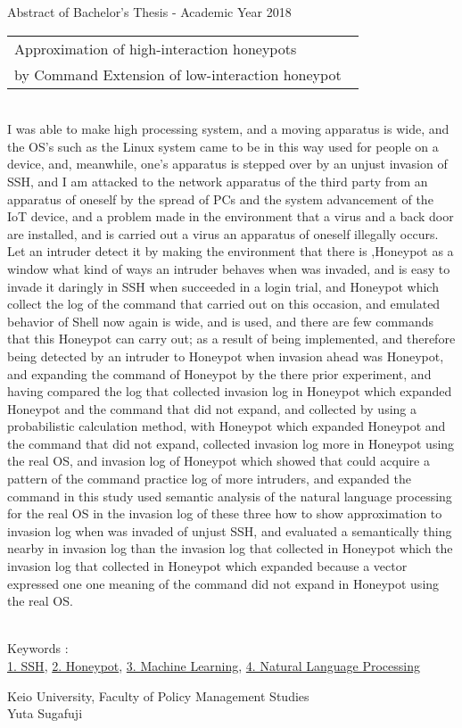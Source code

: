 Abstract of Bachelor's Thesis - Academic Year 2018
\begin{center}
\begin{large}
\begin{tabular}{|p{0.97\linewidth}|}
    \hline
        Approximation of high-interaction honeypots\\
by Command Extension of low-interaction honeypot\\
    \hline
\end{tabular}
\end{large}
\end{center}

~ \\
\renewcommand{\baselinestretch}{0.9}
I was able to make high processing system, and a moving apparatus is wide, and the OS's such as the Linux system came to be in this way used for people on a device, and, meanwhile, one's apparatus is stepped over by an unjust invasion of SSH, and I am attacked to the network apparatus of the third party from an apparatus of oneself by the spread of PCs and the system advancement of the IoT device, and a problem made in the environment that a virus and a back door are installed, and is carried out a virus an apparatus of oneself illegally occurs.
Let an intruder detect it by making the environment that there is ,Honeypot as a window what kind of ways an intruder behaves when was invaded, and is easy to invade it daringly in SSH when succeeded in a login trial, and Honeypot which collect the log of the command that carried out on this occasion, and emulated behavior of Shell now again is wide, and is used, and there are few commands that this Honeypot can carry out; as a result of being implemented, and therefore being detected by an intruder to Honeypot when invasion ahead was Honeypot, and expanding the command of Honeypot by the there prior experiment, and having compared the log that collected invasion log in Honeypot which expanded Honeypot and the command that did not expand, and collected by using a probabilistic calculation method, with Honeypot which expanded Honeypot and the command that did not expand, collected invasion log more in Honeypot using the real OS, and invasion log of Honeypot which showed that could acquire a pattern of the command practice log of more intruders, and expanded the command in this study used semantic analysis of the natural language processing for the real OS in the invasion log of these three how to show approximation to invasion log when was invaded of unjust SSH, and evaluated a semantically thing nearby in invasion log than the invasion log that collected in Honeypot which the invasion log that collected in Honeypot which expanded because a vector expressed one one meaning of the command did not expand in Honeypot using the real OS.
\renewcommand{\baselinestretch}{1.0}

~ \\
Keywords : \\
\underline{1. SSH},
\underline{2. Honeypot},
\underline{3. Machine Learning},
\underline{4. Natural Language Processing}
\begin{flushright}
Keio University, Faculty of Policy Management Studies\\
Yuta Sugafuji
\end{flushright}
